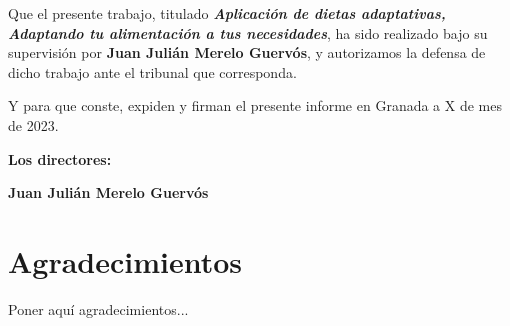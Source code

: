 Que el presente trabajo, titulado \textit{\textbf{Aplicación de dietas adaptativas,  Adaptando tu alimentación a tus necesidades}},
ha sido realizado bajo su supervisión por \textbf{Juan Julián Merelo Guervós}, y autorizamos la defensa de dicho trabajo ante el tribunal
que corresponda.

\vspace{0.5cm}

Y para que conste, expiden y firman el presente informe en Granada a X de mes de 2023.

\vspace{1cm}

\textbf{Los directores:}

\vspace{5cm}

\noindent \textbf{Juan Julián Merelo Guervós}

\chapter*{Agradecimientos}
\thispagestyle{empty}

       \vspace{1cm}


Poner aquí agradecimientos...

